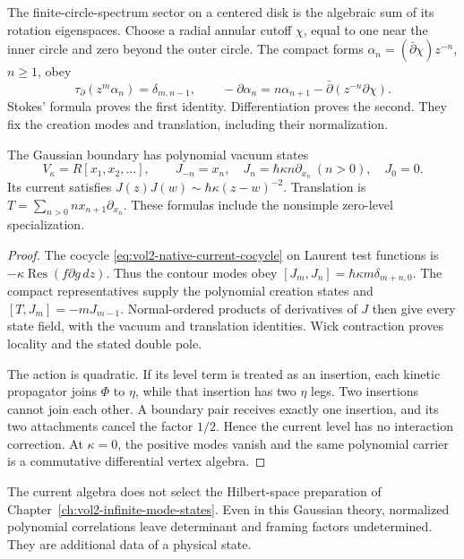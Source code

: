The finite-circle-spectrum sector on a centered disk is the algebraic
sum of its rotation eigenspaces. Choose a radial annular cutoff \(\chi\),
equal to one near the inner circle and zero beyond the outer circle.
The compact forms \(\alpha_n=(\bar\partial\chi)z^{-n}\), \(n\geq1\), obey
\[
 \tau_\partial(z^m\alpha_n)=\delta_{m,n-1},\qquad
 -\partial\alpha_n=n\alpha_{n+1}
                    -\bar\partial(z^{-n}\partial\chi).
\]
Stokes' formula proves the first identity. Differentiation proves the second.
They fix the creation modes and translation, including their normalization.

\begin{proposition}\label{prop:vol2-native-heisenberg}
The Gaussian boundary has polynomial vacuum states
\[
 V_\kappa=R[x_1,x_2,\ldots],\qquad
 J_{-n}=x_n,\quad J_n=\hbar\kappa n\partial_{x_n}\ (n>0),\quad J_0=0.
\]
Its current satisfies \(J(z)J(w)\sim\hbar\kappa(z-w)^{-2}\).
Translation is \(T=\sum_{n>0}n x_{n+1}\partial_{x_n}\).
These formulas include the nonsimple zero-level specialization.
\end{proposition}

\begin{proof}
The cocycle \eqref{eq:vol2-native-current-cocycle} on Laurent test functions
is \(-\kappa\operatorname{Res}(f\partial g\,dz)\). Thus the contour modes
obey \([J_m,J_n]=\hbar\kappa m\delta_{m+n,0}\).
The compact representatives supply the polynomial creation states and
\([T,J_m]=-mJ_{m-1}\). Normal-ordered products of derivatives of \(J\)
then give every state field, with the vacuum and translation identities.
Wick contraction proves locality and the stated double pole.

The action is quadratic. If its level term is treated as an insertion,
each kinetic propagator joins \(\Phi\) to \(\eta\), while that insertion
has two \(\eta\) legs. Two insertions cannot join each other.
A boundary pair receives exactly one insertion, and its two attachments
cancel the factor \(1/2\). Hence the current level has no interaction
correction. At \(\kappa=0\), the positive modes vanish and the same
polynomial carrier is a commutative differential vertex algebra.
\end{proof}

The current algebra does not select the Hilbert-space preparation of
Chapter~\ref{ch:vol2-infinite-mode-states}. Even in this Gaussian theory,
normalized polynomial correlations leave determinant and framing factors
undetermined. They are additional data of a physical state.

